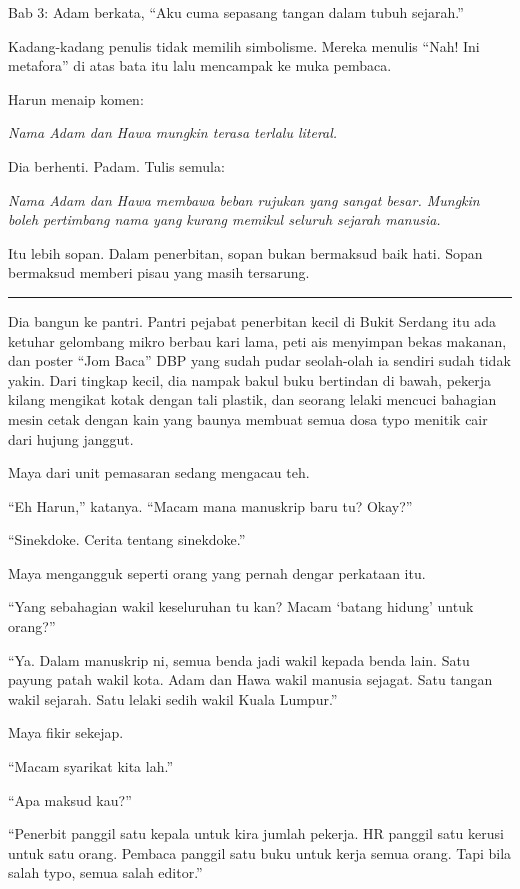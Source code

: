 \documentclass[
  11pt,
  a5paper,
  openany,
  oneside]{book}
\begin{document}
Bab 3: Adam berkata, ``Aku cuma sepasang tangan dalam tubuh sejarah.''

Kadang-kadang penulis tidak memilih simbolisme. Mereka menulis ``Nah!
Ini metafora'' di atas bata itu lalu mencampak ke muka pembaca.

Harun menaip komen:

\emph{Nama Adam dan Hawa mungkin terasa terlalu literal.}

Dia berhenti. Padam. Tulis semula:

\emph{Nama Adam dan Hawa membawa beban rujukan yang sangat besar.
Mungkin boleh pertimbang nama yang kurang memikul seluruh sejarah
manusia.}

Itu lebih sopan. Dalam penerbitan, sopan bukan bermaksud baik hati.
Sopan bermaksud memberi pisau yang masih tersarung.

\begin{center}\rule{0.5\linewidth}{0.5pt}\end{center}

Dia bangun ke pantri. Pantri pejabat penerbitan kecil di Bukit Serdang
itu ada ketuhar gelombang mikro berbau kari lama, peti ais menyimpan
bekas makanan, dan poster ``Jom Baca'' DBP yang sudah pudar seolah-olah
ia sendiri sudah tidak yakin. Dari tingkap kecil, dia nampak bakul buku
bertindan di bawah, pekerja kilang mengikat kotak dengan tali plastik,
dan seorang lelaki mencuci bahagian mesin cetak dengan kain yang baunya
membuat semua dosa typo menitik cair dari hujung janggut.

Maya dari unit pemasaran sedang mengacau teh.

``Eh Harun,'' katanya. ``Macam mana manuskrip baru tu? Okay?''

``Sinekdoke. Cerita tentang sinekdoke.''

Maya mengangguk seperti orang yang pernah dengar perkataan itu.

``Yang sebahagian wakil keseluruhan tu kan? Macam `batang hidung' untuk
orang?''

``Ya. Dalam manuskrip ni, semua benda jadi wakil kepada benda lain. Satu
payung patah wakil kota. Adam dan Hawa wakil manusia sejagat. Satu
tangan wakil sejarah. Satu lelaki sedih wakil Kuala Lumpur.''

Maya fikir sekejap.

``Macam syarikat kita lah.''

``Apa maksud kau?''

``Penerbit panggil satu kepala untuk kira jumlah pekerja. HR panggil
satu kerusi untuk satu orang. Pembaca panggil satu buku untuk kerja
semua orang. Tapi bila salah typo, semua salah editor.''
\end{document}
